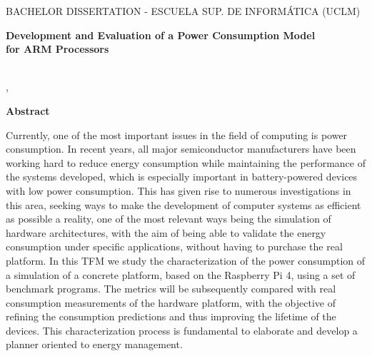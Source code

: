 \cleardoublepage %

\makeatletter
\begin{center} %
   {\textsc{BACHELOR DISSERTATION - ESCUELA SUP. DE INFORMÁTICA (UCLM)}\par}
   \vspace{1cm} %
   {\textbf{\Large Development and Evaluation of a Power Consumption Model\\for ARM Processors}\par}
   \vspace{0.4cm} %
   {\@autor \\ \@cityTF,{} \@monthTF{} \@yearTF\par} 
   \vspace{0.9cm} %
   {\textbf{\large\textsf{Abstract}}\par} 
\end{center}   
\makeatother %

Currently, one of the most important issues in the field of computing is power consumption. In recent years, all major semiconductor manufacturers have been working hard to reduce energy consumption while maintaining the performance of the systems developed, which is especially important in battery-powered devices with low power consumption. This has given rise to numerous investigations in this area, seeking ways to make the development of computer systems as efficient as possible a reality, one of the most relevant ways being the simulation of hardware architectures, with the aim of being able to validate the energy consumption under specific applications, without having to purchase the real platform. In this TFM we study the characterization of the power consumption of a simulation of a concrete platform, based on the Raspberry Pi 4, using a set of benchmark programs. The metrics will be subsequently compared with real consumption measurements of the hardware platform, with the objective of refining the consumption predictions and thus improving the lifetime of the devices. This characterization process is fundamental to elaborate and develop a planner oriented to energy management.

\cleardoublepage %